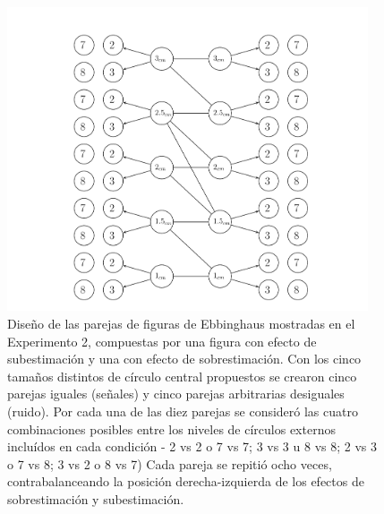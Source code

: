 \begin{itemize}
\begin{figure}[th]
\centering
\includegraphics[width=0.95\textwidth]{Figures/Estimulos_Experimento2} 
\decoRule
\caption[Diseño de Estímulos en el Experimento 2]{Diseño de las parejas de figuras de Ebbinghaus mostradas en el Experimento 2, compuestas por una figura con efecto de subestimación y una con efecto de sobrestimación. Con los cinco tamaños distintos de círculo central propuestos se crearon cinco parejas iguales (señales) y cinco parejas arbitrarias desiguales (ruido). Por cada una de las diez parejas se consideró las cuatro combinaciones posibles entre los niveles de círculos externos incluídos en cada condición - 2 vs 2 o 7 vs 7; 3 vs 3 u 8 vs 8; 2 vs 3 o 7 vs 8; 3 vs 2 o 8 vs 7) Cada pareja se repitió ocho veces, contrabalanceando la posición derecha-izquierda de los efectos de sobrestimación y subestimación.}
\label{fig:Exp_2}
\end{figure}
\end{itemize}


